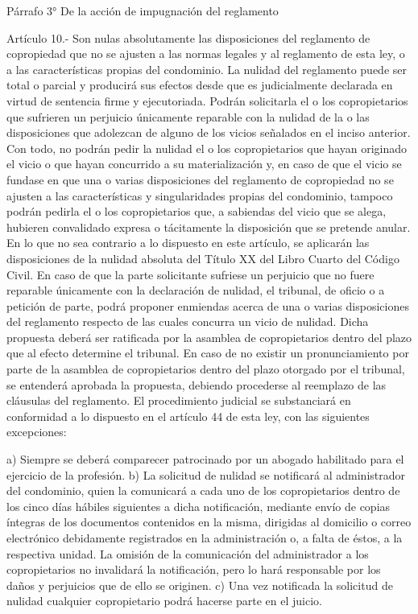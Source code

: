     Párrafo 3°
    De la acción de impugnación del reglamento

     
    Artículo 10.- Son nulas absolutamente las disposiciones del reglamento de copropiedad que no se ajusten a las normas legales y al reglamento de esta ley, o a las características propias del condominio.
    La nulidad del reglamento puede ser total o parcial y producirá sus efectos desde que es judicialmente declarada en virtud de sentencia firme y ejecutoriada. Podrán solicitarla el o los copropietarios que sufrieren un perjuicio únicamente reparable con la nulidad de la o las disposiciones que adolezcan de alguno de los vicios señalados en el inciso anterior. Con todo, no podrán pedir la nulidad el o los copropietarios que hayan originado el vicio o que hayan concurrido a su materialización y, en caso de que el vicio se fundase en que una o varias disposiciones del reglamento de copropiedad no se ajusten a las características y singularidades propias del condominio, tampoco podrán pedirla el o los copropietarios que, a sabiendas del vicio que se alega, hubieren convalidado expresa o tácitamente la disposición que se pretende anular.
    En lo que no sea contrario a lo dispuesto en este artículo, se aplicarán las disposiciones de la nulidad absoluta del Título XX del Libro Cuarto del Código Civil.
    En caso de que la parte solicitante sufriese un perjuicio que no fuere reparable únicamente con la declaración de nulidad, el tribunal, de oficio o a petición de parte, podrá proponer enmiendas acerca de una o varias disposiciones del reglamento respecto de las cuales concurra un vicio de nulidad. Dicha propuesta deberá ser ratificada por la asamblea de copropietarios dentro del plazo que al efecto determine el tribunal. En caso de no existir un pronunciamiento por parte de la asamblea de copropietarios dentro del plazo otorgado por el tribunal, se entenderá aprobada la propuesta, debiendo procederse al reemplazo de las cláusulas del reglamento.
    El procedimiento judicial se substanciará en conformidad a lo dispuesto en el artículo 44 de esta ley, con las siguientes excepciones:
     
    a) Siempre se deberá comparecer patrocinado por un abogado habilitado para el ejercicio de la profesión.
    b) La solicitud de nulidad se notificará al administrador del condominio, quien la comunicará a cada uno de los copropietarios dentro de los cinco días hábiles siguientes a dicha notificación, mediante envío de copias íntegras de los documentos contenidos en la misma, dirigidas al domicilio o correo electrónico debidamente registrados en la administración o, a falta de éstos, a la respectiva unidad.
    La omisión de la comunicación del administrador a los copropietarios no invalidará la notificación, pero lo hará responsable por los daños y perjuicios que de ello se originen.
    c) Una vez notificada la solicitud de nulidad cualquier copropietario podrá hacerse parte en el juicio.
     
